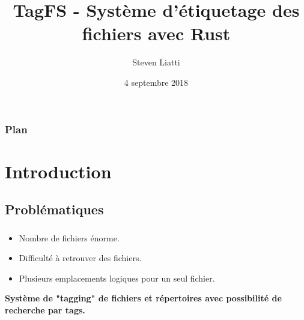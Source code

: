 \documentclass[10pt]{beamer}
\begin{document}

\title{TagFS - Système d'étiquetage des fichiers avec Rust}
\author{Steven Liatti}
\date{4 septembre 2018}

\begin{frame}
\titlepage
\end{frame}

\begin{frame}
    \frametitle{Plan}
    \setcounter{tocdepth}{1}
    \tableofcontents
\end{frame}

\section{Introduction}
\subsection{Problématiques}
\begin{frame}
    \frametitle{\subsecname}
    \begin{itemize}
        \item Nombre de fichiers énorme.
        \pause
        \item Difficulté à retrouver des fichiers.
        \pause
        \item Plusieurs emplacements logiques pour un seul fichier.
        \pause
    \end{itemize}
    \Large\textbf{Système de "tagging" de fichiers et répertoires avec possibilité de recherche par tags.}
\end{frame}
\end{document}
